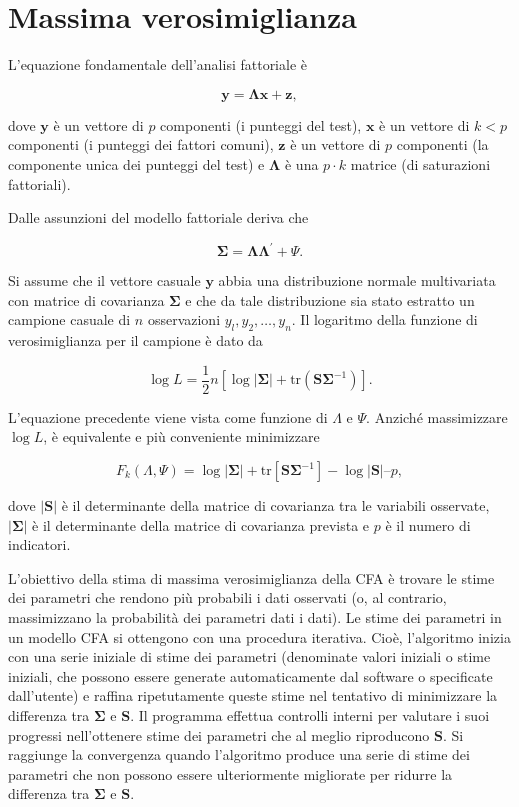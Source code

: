 \documentclass[
  11pt,
]{krantz}
\theoremstyle{definition}
\theoremstyle{definition}
\theoremstyle{definition}
\theoremstyle{definition}
\theoremstyle{remark}
\begin{document}
\hypertarget{massima-verosimiglianza}{%
\section{Massima verosimiglianza}\label{massima-verosimiglianza}}

L'equazione fondamentale dell'analisi fattoriale è

\[
\boldsymbol y = \boldsymbol \Lambda  \boldsymbol x  + \boldsymbol z, 
\]

dove \(\boldsymbol{y}\) è un vettore di \(p\) componenti (i punteggi del test), \(\boldsymbol{x}\) è un vettore di \(k < p\) componenti (i punteggi dei fattori comuni), \(\boldsymbol{z}\) è un vettore di \(p\) componenti (la componente unica dei punteggi del test) e \(\boldsymbol{\Lambda}\) è una \(p \cdot k\) matrice (di saturazioni fattoriali).

Dalle assunzioni del modello fattoriale deriva che

\[
\boldsymbol{\Sigma} = \boldsymbol{\Lambda}\boldsymbol{\Lambda}^\prime + \Psi.
\]

Si assume che il vettore casuale \(\boldsymbol{y}\) abbia una distribuzione normale multivariata con matrice di covarianza \(\boldsymbol{\Sigma}\) e che da tale distribuzione sia stato estratto un campione casuale di \(n\) osservazioni \(y_l, y_2, \dots, y_n\). Il logaritmo della funzione di verosimiglianza per il campione è dato da

\[
\log L = \frac{1}{2}n [\log | \boldsymbol{\Sigma}| + \mbox{tr}(\boldsymbol{\boldsymbol{S} \Sigma}^{-1})].
\]

L'equazione precedente viene vista come funzione di \(\Lambda\) e \(\Psi\). Anziché massimizzare \(\log L\), è equivalente e più conveniente minimizzare

\[
F_{k}(\Lambda, \Psi) = \log |\boldsymbol{\Sigma}| + \mbox{tr}[\boldsymbol{S}\boldsymbol{\Sigma}^{-1}]  - \log|\boldsymbol{S}| – p,
\]

dove \(|\boldsymbol{S}|\) è il determinante della matrice di covarianza tra le variabili osservate, \(|\boldsymbol{\Sigma}|\) è il determinante della matrice di covarianza prevista e \(p\) è il numero di indicatori.

L'obiettivo della stima di massima verosimiglianza della CFA è trovare le stime dei parametri che rendono più probabili i dati osservati (o, al contrario, massimizzano la probabilità dei parametri dati i dati). Le stime dei parametri in un modello CFA si ottengono con una procedura iterativa. Cioè, l'algoritmo inizia con una serie iniziale di stime dei parametri (denominate valori iniziali o stime iniziali, che possono essere generate automaticamente dal software o specificate dall'utente) e raffina ripetutamente queste stime nel tentativo di minimizzare la differenza tra \(\boldsymbol{\Sigma}\) e \(\boldsymbol{S}\). Il programma effettua controlli interni per valutare i suoi progressi nell'ottenere stime dei parametri che al meglio riproducono \(\boldsymbol{S}\). Si raggiunge la convergenza quando l'algoritmo produce una serie di stime dei parametri che non possono essere ulteriormente migliorate per ridurre la differenza tra \(\boldsymbol{\Sigma}\) e \(\boldsymbol{S}\).
\end{document}
